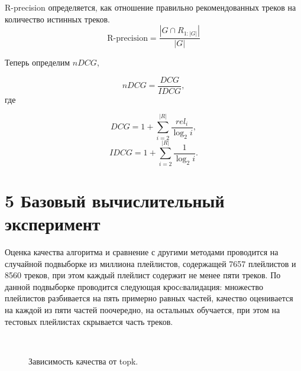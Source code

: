 \documentclass[12pt,twoside]{article}
\begin{document}
R-precision определяется, как отношение правильно рекомендованных треков на количество истинных треков.
$$\text{R-precision} = \frac{|G \cap R_{1:|G|}|}{|G|}$$

Теперь определим $nDCG$,

$$nDCG = \frac{DCG}{IDCG},$$
где

$$DCG = 1 + \sum_{i = 2}^{|R|} \frac{rel_i}{\log_{2}i},$$
$$IDCG = 1 + \sum_{i = 2}^{|R|} \frac{1}{\log_{2}i}.$$

\section{5 Базовый вычислительный эксперимент}

{Оценка качества алгоритма и сравнение с другими методами проводится на случайной подвыборке из миллиона плейлистов, содержащей 7657 плейлистов и 8560 треков, при этом каждый плейлист содержит не менее пяти треков. По данной подвыборке проводится следующая кросcвалидация: множество плейлистов разбивается на пять примерно равных частей, качество оценивается на каждой из пяти частей поочередно, на остальных обучается, при этом на тестовых плейлистах скрывается часть треков.

\begin{figure}[ht]\center
{}
\\
\caption{Зависимость качества от topk.}
\label{wine88}
\end{figure}}

  
\end{document}
